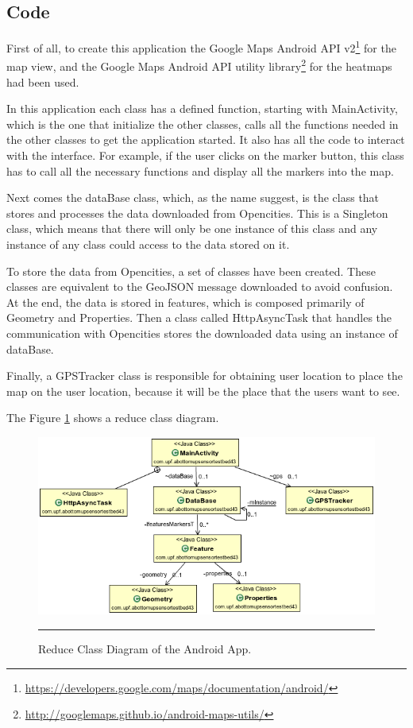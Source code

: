 \documentclass[12pt, a4paper,twoside]{tesi_upf}
\begin{document}
    \subsection{Code}
      First of all, to create this application the Google Maps Android API v2\footnote{\url{https://developers.google.com/maps/documentation/android/}} for the map view, and the Google Maps Android API utility library\footnote{\url{http://googlemaps.github.io/android-maps-utils/}} for the heatmaps had been used.
      
      In this application each class has a defined function, starting with MainActivity, which is the one that initialize the other classes, calls all the functions needed in the other classes to get the application started.
      It also has all the code to interact with the interface. For example, if the user clicks on the marker button, this class has to call all the necessary functions and display all the markers into the map.
      
      Next comes the dataBase class, which, as the name suggest, is the class that stores and processes the data downloaded from Opencities. This is a Singleton class, which means that there will only be one instance of this class and any instance of any class could access to the data stored on it.
      
      To store the data from Opencities, a set of classes have been created. These classes are equivalent to the GeoJSON message downloaded to avoid confusion. At the end, the data is stored in features, which is composed primarily of Geometry and Properties.
      Then a class called HttpAsyncTask that handles the communication with Opencities stores the downloaded data using an instance of dataBase.
      
      Finally, a GPSTracker class is responsible for obtaining user location to place the map on the user location, because it will be the place that the users want to see.
           
      The Figure \ref{fig:ClassDiagram} shows a reduce class diagram.
      
      \begin{figure}[htbp]
        \centering
          \includegraphics[page=1,scale=0.8]{./Figures/SmallClassDiagram.png}
        \rule{20em}{0.5pt}
        \caption[Reduce Class Diagram of the Android App]{Reduce Class Diagram of the Android App.}
        \label{fig:ClassDiagram}
      \end{figure}
      
\end{document}
